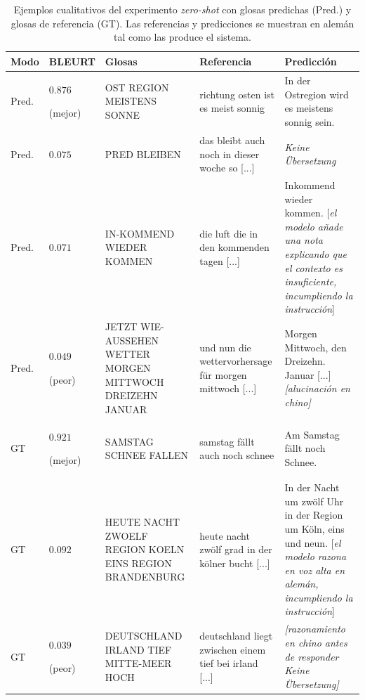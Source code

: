 \begin{table}[htbp]
	\centering
	\small
	\renewcommand{\arraystretch}{1.5}
	\begin{tabular}{p{} >{\centering\arraybackslash}p{} p{} p{} p{}}
		\hline
		\textbf{Modo} & \textbf{BLEURT} & \textbf{Glosas} & \textbf{Referencia} & \textbf{Predicción} \\ \hline

		Pred. & $0.876$\par(mejor)
		    & OST REGION MEISTENS SONNE
		    & richtung osten ist es meist sonnig
		    & In der Ostregion wird es meistens sonnig sein. \\

		Pred. & $0.075$
		    & PRED BLEIBEN
		    & das bleibt auch noch in dieser woche so [...]
		    & \textit{Keine Übersetzung} \\

		Pred. & $0.071$
		    & IN-KOMMEND WIEDER KOMMEN
		    & die luft die in den kommenden tagen [...]
		    & Inkommend wieder kommen. [\textit{el modelo añade una nota explicando que el contexto es insuficiente, incumpliendo la instrucción}] \\

		Pred. & $0.049$\par(peor)
		    & JETZT WIE-AUSSEHEN WETTER MORGEN MITTWOCH DREIZEHN JANUAR
		    & und nun die wettervorhersage für morgen mittwoch [...]
		    & Morgen Mittwoch, den Dreizehn. Januar [...] \textit{[alucinación en chino]} \\

		\hline

		GT & $0.921$\par(mejor)
		    & SAMSTAG SCHNEE FALLEN
		    & samstag fällt auch noch schnee
		    & Am Samstag fällt noch Schnee. \\

		GT & $0.092$
		    & HEUTE NACHT ZWOELF REGION KOELN EINS REGION BRANDENBURG
		    & heute nacht zwölf grad in der kölner bucht [...]
		    & In der Nacht um zwölf Uhr in der Region um Köln, eins und neun. [\textit{el modelo razona en voz alta en alemán, incumpliendo la instrucción}] \\

		GT & $0.039$\par(peor)
		    & DEUTSCHLAND IRLAND TIEF MITTE-MEER HOCH
		    & deutschland liegt zwischen einem tief bei irland [...]
		    & \textit{[razonamiento en chino antes de responder Keine Übersetzung]} \\

		\hline
	\end{tabular}
	\caption{Ejemplos cualitativos del experimento \textit{zero-shot} con glosas predichas (Pred.) y glosas de referencia (GT). Las referencias y predicciones se muestran en alemán tal como las produce el sistema.}
	\label{tab:zeroshot_examples}
\end{table}

